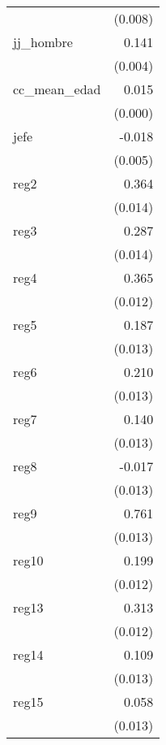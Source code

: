 {\begin{longtable}{l*{1}{D{.}{.}{-1}}}
            &     (0.008)         \\
\addlinespace
jj\_hombre   &       0.141\sym{***}\\
            &     (0.004)         \\
\addlinespace
cc\_mean\_edad&       0.015\sym{***}\\
            &     (0.000)         \\
\addlinespace
jefe        &      -0.018\sym{***}\\
            &     (0.005)         \\
\addlinespace
reg2        &       0.364\sym{***}\\
            &     (0.014)         \\
\addlinespace
reg3        &       0.287\sym{***}\\
            &     (0.014)         \\
\addlinespace
reg4        &       0.365\sym{***}\\
            &     (0.012)         \\
\addlinespace
reg5        &       0.187\sym{***}\\
            &     (0.013)         \\
\addlinespace
reg6        &       0.210\sym{***}\\
            &     (0.013)         \\
\addlinespace
reg7        &       0.140\sym{***}\\
            &     (0.013)         \\
\addlinespace
reg8        &      -0.017         \\
            &     (0.013)         \\
\addlinespace
reg9        &       0.761\sym{***}\\
            &     (0.013)         \\
\addlinespace
reg10       &       0.199\sym{***}\\
            &     (0.012)         \\
\addlinespace
reg13       &       0.313\sym{***}\\
            &     (0.012)         \\
\addlinespace
reg14       &       0.109\sym{***}\\
            &     (0.013)         \\
\addlinespace
reg15       &       0.058\sym{***}\\
            &     (0.013)         \\

\end{longtable}}
